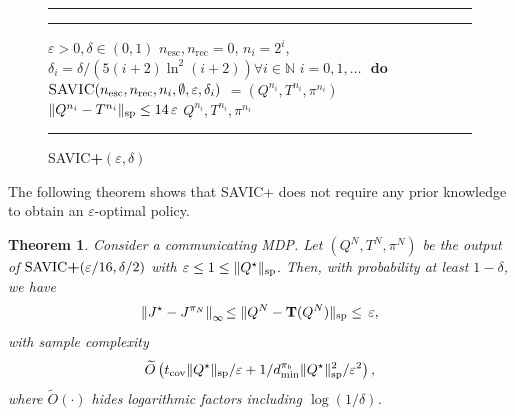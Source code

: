 \documentclass{article}
\newtheorem{theorem}{Theorem}[section]
\theoremstyle{definition}
\theoremstyle{remark}
\newcommand{\T}{\mathbf{T}}
\newcommand{\NN}{\mathbb{N}}
\newcommand*{\infn}[1]{\left\|{#1}\right\|_{\infty}}
\renewcommand{\sp}[1]{\|{#1}\|_\text{\rm sp}}
\begin{document}
\begin{figure}
\vspace{-.13in}
\captionsetup{type=algorithm}
\hrule
\vspace{2pt}
\begin{minipage}{0.4\textwidth}
  \caption{\mbox{\sc \mbox{\rm SAVIC\textbf{+}}}$( \varepsilon,\delta)$}
  \label{alg:SAVIC+}
\vspace{-.1in}
\hrule
\begin{algorithmic}
   $\varepsilon>0, \delta\in(0,1)$
   $n_{\mathrm{esc}},n_{\mathrm{rec}}\!=\!0$, $n_i\! =\!2^i$,  $\delta_i = \delta/(5(i\!+\!2)\ln^2(i\!+\!2)) \forall i \in \NN$  
   $i=0,1,\dots$ \,\,\textbf{do} 
    \State \quad $\mbox{\sc\mbox{SAVIC}}( n_{\mathrm{esc}},n_{\mathrm{rec}}, n_i, \emptyset, \varepsilon, \delta_i)$
    \State \quad $=(Q^{n_i},T^{n_i}, \pi^{n_i} )$
      $\sp{Q^{n_i}-T^{n_i}}\leq 14\,\varepsilon$
 $Q^{n_i},T^{n_i}, \pi^{n_i}$
\end{algorithmic}
\hrule
\end{minipage}
\vspace{.2in}
\end{figure}


The following theorem shows that SAVIC+ does not require any prior knowledge to obtain an $\varepsilon$-optimal policy.
\begin{theorem}\label{thm:savic+}
Consider a communicating MDP. Let $(Q^{N},T^{N},\pi^{N})$ be the output of $\mbox{\sc \mbox{\rm SAVIC\textbf{+}}}(\varepsilon/16,\delta/2)$ with $\varepsilon \le 1 \le \sp{Q^\star}$. Then, with probability at least $1-\delta$, we have
\vspace{-1ex}
\begin{equation*}
\infn{J^\star-J^{\pi_{N}}}\! \leq \sp{Q^N-\T(Q^N)}\leq \,\varepsilon,
\end{equation*}
with sample complexity
\[
\widetilde{O}\left(t_{\mathrm{cov}}\sp{Q^\star}/\varepsilon
+ 1/d^{\pi_b}_{\mathrm{min}} \sp{Q^\star}^2/\varepsilon^{2}\right),
\]
where $\widetilde{O}(\cdot)$ hides logarithmic factors including $\log(1/\delta)$.
\end{theorem}
\end{document}
